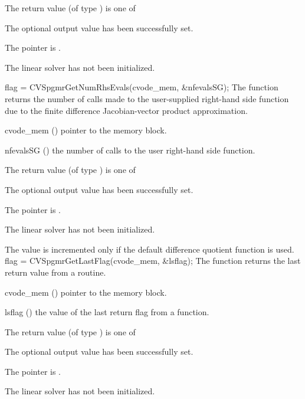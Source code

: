 {
  The return value  (of type ) is one of
  \begin{args}
  \item[\Id{CVSPGMR\_SUCCESS}] 
    The optional output value has been successfully set.
  \item[\Id{CVSPGMR\_MEM\_NULL}]
    The  pointer is .
  \item[\Id{CVSPGMR\_LMEM\_NULL}]
    The {\cvspgmr} linear solver has not been initialized.
  \end{args}
}
{}
{
  flag = CVSpgmrGetNumRhsEvals(cvode\_mem, \&nfevalsSG);
}
{
  The function  returns the
  number of calls made to the user-supplied right-hand side function due to the
  finite difference Jacobian-vector product approximation.
}
{
  \begin{args}
  \item[cvode\_mem] ()
    pointer to the {\cvodes} memory block.
  \item[nfevalsSG] ()
    the number of calls to the user right-hand side function.
  \end{args}
}
{
  The return value  (of type ) is one of
  \begin{args}
  \item[\Id{CVSPGMR\_SUCCESS}] 
    The optional output value has been successfully set.
  \item[\Id{CVSPGMR\_MEM\_NULL}]
    The  pointer is .
  \item[\Id{CVSPGMR\_LMEM\_NULL}]
    The {\cvspgmr} linear solver has not been initialized.
  \end{args}
}
{
  The value  is incremented only if the default 
   difference quotient function is used.
}
{
  flag = CVSpgmrGetLastFlag(cvode\_mem, \&lsflag);
}
{
  The function  returns the
  last return value from a {\cvspgmr} routine. 
}
{
  \begin{args}
  \item[cvode\_mem] ()
    pointer to the {\cvodes} memory block.
  \item[lsflag] ()
    the value of the last return flag from a {\cvspgmr} function.
  \end{args}
}
{
  The return value  (of type ) is one of
  \begin{args}
  \item[\Id{CVSPGMR\_SUCCESS}] 
    The optional output value has been successfully set.
  \item[\Id{CVSPGMR\_MEM\_NULL}]
    The  pointer is .
  \item[\Id{CVSPGMR\_LMEM\_NULL}]
    The {\cvspgmr} linear solver has not been initialized.
  \end{args}
}
